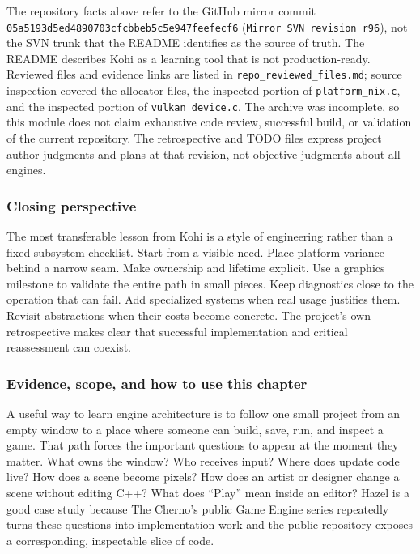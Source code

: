 The repository facts above refer to the GitHub mirror commit \texttt{05a5193d5ed4890703cfcbbeb5c5e947feefecf6} (\texttt{Mirror\ SVN\ revision\ r96}), not the SVN trunk that the README identifies as the source of truth. The README describes Kohi as a learning tool that is not production-ready. Reviewed files and evidence links are listed in \texttt{repo\_reviewed\_files.md}; source inspection covered the allocator files, the inspected portion of \texttt{platform\_nix.c}, and the inspected portion of \texttt{vulkan\_device.c}. The archive was incomplete, so this module does not claim exhaustive code review, successful build, or validation of the current repository. The retrospective and TODO files express project author judgments and plans at that revision, not objective judgments about all engines.

\subsubsection{Closing perspective}\label{06-engine-ii-ch042-closing-perspective}

\hypertarget{06-engine-ii-ch042-closing-perspective}{}

The most transferable lesson from Kohi is a style of engineering rather than a fixed subsystem checklist. Start from a visible need. Place platform variance behind a narrow seam. Make ownership and lifetime explicit. Use a graphics milestone to validate the entire path in small pieces. Keep diagnostics close to the operation that can fail. Add specialized systems when real usage justifies them. Revisit abstractions when their costs become concrete. The project's own retrospective makes clear that successful implementation and critical reassessment can coexist.

\subsubsection{Evidence, scope, and how to use this chapter}\label{06-engine-ii-ch042-evidence-scope-and-how-to-use-this-chapter}

\hypertarget{06-engine-ii-ch042-evidence-scope-and-how-to-use-this-chapter}{}

A useful way to learn engine architecture is to follow one small project from an empty window to a place where someone can build, save, run, and inspect a game. That path forces the important questions to appear at the moment they matter. What owns the window? Who receives input? Where does update code live? How does a scene become pixels? How does an artist or designer change a scene without editing C++? What does ``Play'' mean inside an editor? Hazel is a good case study because The Cherno's public Game Engine series repeatedly turns these questions into implementation work and the public repository exposes a corresponding, inspectable slice of code.

